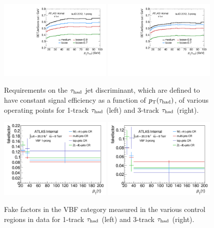 \clearpage

\begin{figure}[tp]
  \centering
  \includegraphics[width=0.48\textwidth]{figures/backgrounds/jetBDT-1p}
  \includegraphics[width=0.48\textwidth]{figures/backgrounds/jetBDT-3p}
  \caption{Requirements on the $\tau_\text{had}$ jet discriminant, which are defined to have constant signal efficiency as a function of $p_{\mathrm{T}}(\tau_\text{had})$, of various operating points for 1-track $\tau_\text{had}$ (left) and 3-track $\tau_\text{had}$ (right).}
  \label{fig:backgrounds-workingpoints}
\end{figure}

\begin{figure}[tp]
  \centering
  \includegraphics[width=0.48\textwidth]{figures/backgrounds/fakefactor_8TeV_vbf_1p_CRs}
  \includegraphics[width=0.48\textwidth]{figures/backgrounds/fakefactor_8TeV_vbf_3p_CRs}
  \caption{Fake factors in the VBF category measured in the various control regions in data for 1-track $\tau_\text{had}$ (left) and 3-track $\tau_\text{had}$ (right).}
  \label{fig:backgrounds-fakefactorsVBFCRs}
\end{figure}

